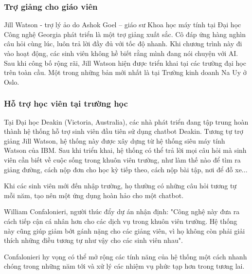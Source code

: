 \subsubsection{Trợ giảng cho giáo viên}
Jill Watson - trợ lý ảo do Ashok Goel \parencite{goel2016jill} – giáo sư Khoa học máy tính tại Đại học Công nghệ Georgia phát triển là một trợ giảng xuất sắc. Cô đáp ứng hàng nghìn câu hỏi cùng lúc, luôn trả lời đầy đủ với tốc độ nhanh. Khi chương trình này đi vào hoạt động, các sinh viên không hề biết rằng mình đang nói chuyện với AI. Sau khi công bố rộng rãi, Jill Watson hiện được triển khai tại các trường đại học trên toàn cầu. Một trong những bản mới nhất là tại Trường kinh doanh Na Uy ở Oslo.\par
\subsubsection{Hỗ trợ học viên tại trường học}
Tại Đại học Deakin (Victoria, Australia), các nhà phát triển đang tập trung hoàn thành hệ thống hỗ trợ sinh viên đầu tiên sử dụng chatbot Deakin. Tương tự trợ giảng Jill Watson, hệ thống này được xây dựng từ hệ thống siêu máy tính Watson của IBM. Sau khi triển khai, hệ thống có thể trả lời mọi câu hỏi mà sinh viên cần biết về cuộc sống trong khuôn viên trường, như làm thế nào để tìm ra giảng đường, cách nộp đơn cho học kỳ tiếp theo, cách nộp bài tập, nơi để đỗ xe...\par
Khi các sinh viên mới đến nhập trường, họ thường có những câu hỏi tương tự mỗi năm, tạo nên một ứng dụng hoàn hảo cho một chatbot.\par
William Confalonieri, người thúc đẩy dự án nhận định: "Công nghệ này đưa ra cách tiếp cận cá nhân hơn cho các dịch vụ trong khuôn viên trường. Hệ thống này cũng giúp giảm bớt gánh nặng cho các giảng viên, vì họ không còn phải giải thích những điều tương tự như vậy cho các sinh viên nhau".\par
Confalonieri hy vọng có thể mở rộng các tính năng của hệ thống một cách nhanh chóng trong những năm tới và xử lý các nhiệm vụ phức tạp hơn trong tương lai.\par
